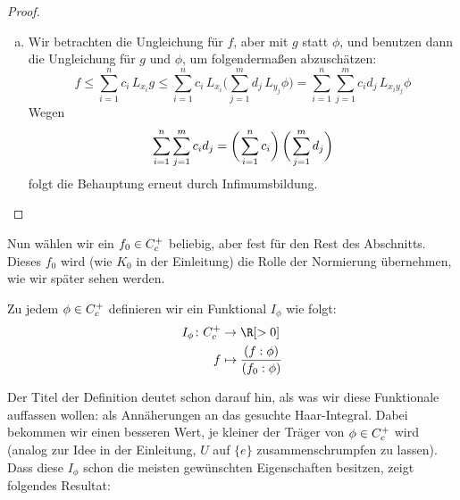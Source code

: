 \begin{proof}
\begin{enumerate}[(a)]
        \item
            Wir betrachten die Ungleichung für $f$, aber mit $g$ statt $\phi$, und
            benutzen dann die Ungleichung für $g$ und $\phi$, um folgendermaßen
            abzuschätzen:
            \[ f \leq \sum_{i=1}^n c_i \, L_{x_i}g 
                \leq \sum_{i=1}^n c_i \, L_{x_i}\biggl( 
                        \sum_{j=1}^m d_j \, L_{y_j}\phi
                    \biggr)
                = \sum_{i=1}^n\sum_{j=1}^m c_i d_j \, L_{x_iy_j}\phi
            \]
            Wegen
            \[ \sum_{i=1}^n\sum_{j=1}^m c_i d_j 
                =   \biggl(\mkern2mu \sum_{i=1}^n c_i \biggr) \, 
                    \biggl(\mkern2mu \sum_{j=1}^m d_j \biggr)
            \]
            folgt die Behauptung erneut durch Infimumsbildung.
    \end{enumerate}
\end{proof}

\medskip
Nun wählen wir ein $f_0\in C_c^+$ beliebig, aber fest für den Rest des
Abschnitts. Dieses $f_0$ wird (wie $K_0$ in der Einleitung) die Rolle der
Normierung übernehmen, wie wir später sehen werden.

\begin{thDef}
    Zu jedem $\phi \in C_c^+$ definieren wir ein Funktional $I_\phi$ wie folgt:
    \begin{align*}
        I_\phi\colon \contcompplus &\to         \R[>0]      \\
                                f  &\mapsto     \frac{(f : \phi)}{(f_0 : \phi)}
    \end{align*}
\end{thDef}
%
Der Titel der Definition deutet schon darauf hin, als was wir diese Funktionale
auffassen wollen: als Annäherungen an das gesuchte Haar-Integral. Dabei bekommen
wir einen besseren Wert, je kleiner der Träger von $\phi\in C_c^+$ wird
(analog zur Idee in der Einleitung, $U$ auf $\{e\}$ zusammenschrumpfen zu
lassen). Dass diese $I_\phi$ schon die meisten gewünschten Eigenschaften
besitzen, zeigt folgendes Resultat:

